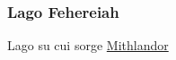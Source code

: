 \subsubsection{Lago Fehereiah}\label{loc:fehereiah}
Lago su cui sorge \hyperref[loc:mithlandor]{Mithlandor}
